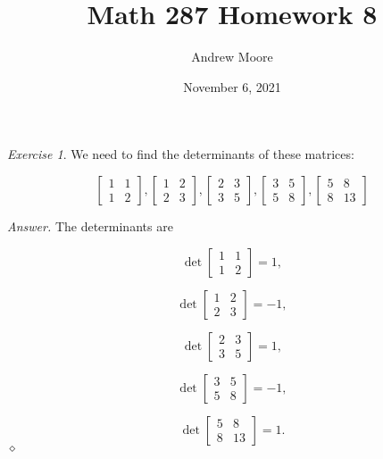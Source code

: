 \documentclass[12pt,oneside]{amsart}
\title{Math 287 Homework 8}
\author{Andrew Moore}
\date{November 6, 2021} %
\theoremstyle{remark}
\newtheorem{exer}{Exercise}
\newenvironment{answer}{\bigskip\noindent\emph{Answer.}}{\hfill$\diamond$\newline}
\begin{document}
\maketitle

\begin{exer}
We need to find the determinants of these matrices:

\[
  \begin{bmatrix}
    1 & 1 \\
    1 & 2
  \end{bmatrix},
  \begin{bmatrix}
    1 & 2 \\
    2 & 3
  \end{bmatrix},
  \begin{bmatrix}
    2 & 3 \\
    3 & 5
  \end{bmatrix},
  \begin{bmatrix}
    3 & 5 \\
    5 & 8
  \end{bmatrix},
  \begin{bmatrix}
    5 & 8 \\
    8 & 13
  \end{bmatrix}
\]
\end{exer}

\begin{answer}
The determinants are

\[
  \det \begin{bmatrix}
    1 & 1 \\
    1 & 2
  \end{bmatrix} = 1,
\]

\[
  \det \begin{bmatrix}
    1 & 2 \\
    2 & 3
  \end{bmatrix} = -1,
\]

\[
  \det \begin{bmatrix}
    2 & 3 \\
    3 & 5
  \end{bmatrix} = 1,
\]

\[
  \det \begin{bmatrix}
    3 & 5 \\
    5 & 8
  \end{bmatrix} = -1,
\]

\[
  \det \begin{bmatrix}
    5 & 8 \\
    8 & 13
  \end{bmatrix} = 1.
\]
\end{answer}
\end{document}
